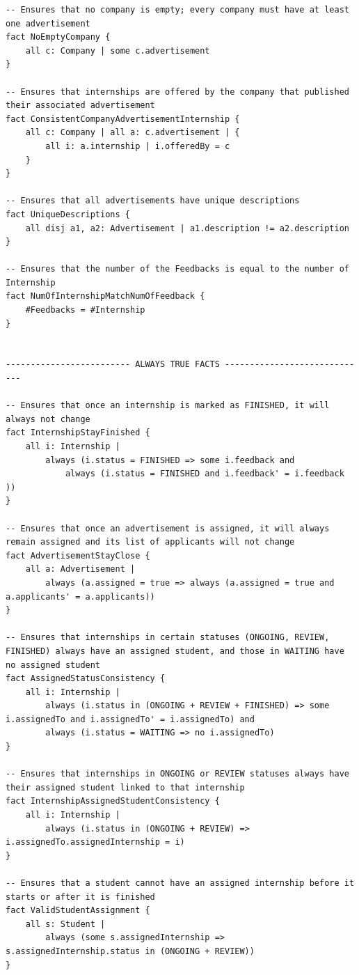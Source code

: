 \begin{lstlisting}
-- Ensures that no company is empty; every company must have at least one advertisement
fact NoEmptyCompany {
    all c: Company | some c.advertisement
}

-- Ensures that internships are offered by the company that published their associated advertisement
fact ConsistentCompanyAdvertisementInternship {
    all c: Company | all a: c.advertisement | {
        all i: a.internship | i.offeredBy = c
    }
}

-- Ensures that all advertisements have unique descriptions
fact UniqueDescriptions {
    all disj a1, a2: Advertisement | a1.description != a2.description
}

-- Ensures that the number of the Feedbacks is equal to the number of Internship
fact NumOfInternshipMatchNumOfFeedback {
	#Feedbacks = #Internship
}


------------------------- ALWAYS TRUE FACTS -----------------------------

-- Ensures that once an internship is marked as FINISHED, it will always not change
fact InternshipStayFinished {
    all i: Internship |
        always (i.status = FINISHED => some i.feedback and
            always (i.status = FINISHED and i.feedback' = i.feedback ))
}

-- Ensures that once an advertisement is assigned, it will always remain assigned and its list of applicants will not change
fact AdvertisementStayClose {
    all a: Advertisement |
        always (a.assigned = true => always (a.assigned = true and a.applicants' = a.applicants))
}

-- Ensures that internships in certain statuses (ONGOING, REVIEW, FINISHED) always have an assigned student, and those in WAITING have no assigned student
fact AssignedStatusConsistency {
    all i: Internship |
        always (i.status in (ONGOING + REVIEW + FINISHED) => some i.assignedTo and i.assignedTo' = i.assignedTo) and
        always (i.status = WAITING => no i.assignedTo)
}

-- Ensures that internships in ONGOING or REVIEW statuses always have their assigned student linked to that internship
fact InternshipAssignedStudentConsistency {
    all i: Internship |
        always (i.status in (ONGOING + REVIEW) => i.assignedTo.assignedInternship = i)
}

-- Ensures that a student cannot have an assigned internship before it starts or after it is finished
fact ValidStudentAssignment {
    all s: Student |
        always (some s.assignedInternship => s.assignedInternship.status in (ONGOING + REVIEW))
}


\end{lstlisting}
